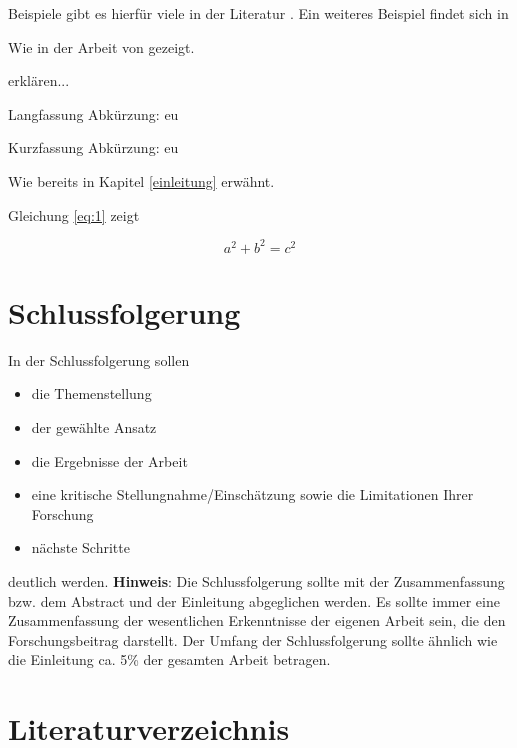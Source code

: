 \documentclass[12pt, oneside]{article}
\begin{document}
Beispiele gibt es hierfür viele in der Literatur \citep{clemen1989combining,gilabert2006intelligent}.
Ein weiteres Beispiel findet sich in \citet{gilabert2006intelligent}

Wie in der Arbeit von \citet{varaiya2011smart} gezeigt.

\citet{sun2006information} erklären...

Langfassung Abkürzung: \ac{eu}

Kurzfassung Abkürzung: \acs{eu}

Wie bereits in Kapitel \ref{einleitung} erwähnt.

Gleichung \ref{eq:1} zeigt

\begin{equation}\label{eq:1}
a^2 + b^2 = c^2
\end{equation}

\clearpage

\section{Schlussfolgerung} \label{sec:schlussfolgerung}
In der Schlussfolgerung sollen
\begin{itemize}
    \item die Themenstellung
    \item der gewählte Ansatz
    \item die Ergebnisse der Arbeit
    \item eine kritische Stellungnahme/Einschätzung sowie die Limitationen Ihrer Forschung
    \item nächste Schritte
\end{itemize}
\bigskip
deutlich werden.
\vspace{3mm}
\newline
\textbf{Hinweis}:
Die Schlussfolgerung sollte mit der Zusammenfassung bzw. dem Abstract und der Einleitung abgeglichen werden. Es sollte immer eine Zusammenfassung der wesentlichen Erkenntnisse der eigenen Arbeit sein, die den Forschungsbeitrag darstellt. Der Umfang der Schlussfolgerung sollte ähnlich wie die Einleitung ca. 5\% der gesamten Arbeit betragen.

\newpage
\section*{Literaturverzeichnis} \label{Literaturverzeichnis}
%
\end{document}
